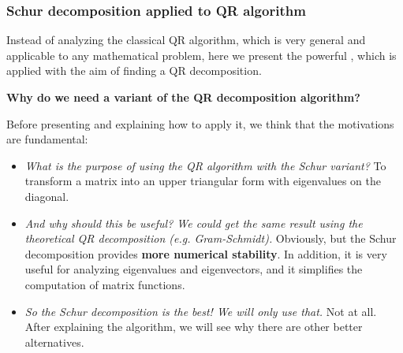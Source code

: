 \subsubsection{Schur decomposition applied to QR algorithm}

Instead of analyzing the classical QR algorithm, which is very general and applicable to any mathematical problem, here we present the powerful , which is applied with the aim of finding a QR decomposition.

\highspace
\begin{flushleft}
    \textcolor{Green3}{ \textbf{Why do we need a variant of the QR decomposition algorithm?}}
\end{flushleft}
Before presenting and explaining how to apply it, we think that the motivations are fundamental:
\begin{itemize}
    \item \emph{What is the purpose of using the QR algorithm with the Schur variant?} To transform a matrix into an upper triangular form with eigenvalues on the diagonal.
    
    \item \emph{And why should this be useful? We could get the same result using the theoretical QR decomposition (e.g. Gram-Schmidt).} Obviously, but the Schur decomposition provides \textbf{more numerical stability}. In addition, it is very useful for analyzing eigenvalues and eigenvectors, and it simplifies the computation of matrix functions.
    
    \item \emph{So the Schur decomposition is the best! We will only use that.} Not at all. After explaining the algorithm, we will see why there are other better alternatives.
\end{itemize}


